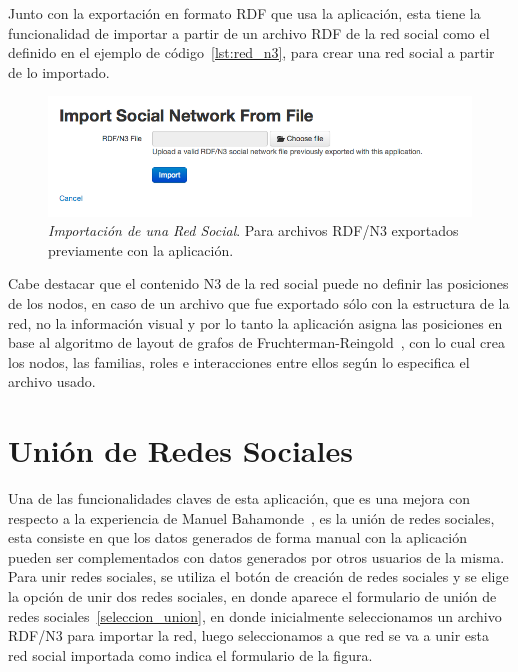Junto con la exportación en formato RDF que usa la aplicación, esta tiene la funcionalidad de importar a partir de un archivo RDF de la red social como el definido en el ejemplo de código~\ref{lst:red_n3}, para crear una red social a partir de lo importado.

\begin{figure}[H]
  \centering
  \includegraphics[width=1.0\textwidth]{images/import_sn.png}
  \caption[Importación de una Red Social]{\emph{Importación de una Red Social}. Para archivos RDF/N3 exportados previamente con la aplicación.}
  \label{import_sn}
\end{figure}

Cabe destacar que el contenido N3 de la red social puede no definir las posiciones de los nodos, en caso de un archivo que fue exportado sólo con la estructura de la red, no la información visual y por lo tanto la aplicación asigna las posiciones en base al algoritmo de layout de grafos de Fruchterman-Reingold~\cite{sna}, con lo cual crea los nodos, las familias, roles e interacciones entre ellos según lo especifica el archivo usado.


\section{Unión de Redes Sociales} %
\label{sec:union_de_redes_sociales}

Una de las funcionalidades claves de esta aplicación, que es una mejora con respecto a la experiencia de Manuel Bahamonde~\cite{memoriamanuel}, es la unión de redes sociales, esta consiste en que los datos generados de forma manual con la aplicación pueden ser complementados con datos generados por otros usuarios de la misma.\\

Para unir redes sociales, se utiliza el botón de creación de redes sociales y se elige la opción de unir dos redes sociales, en donde aparece el formulario de unión de redes sociales~\ref{seleccion_union}, en donde inicialmente seleccionamos un archivo RDF/N3 para importar la red, luego seleccionamos a que red se va a unir esta red social importada como indica el formulario de la figura.\\

